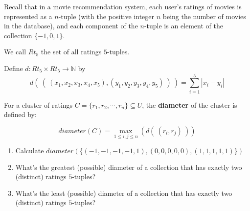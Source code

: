 
Recall that 
in a movie recommendation system, each 
user's ratings of movies is represented as a $n$-tuple 
(with the positive integer $n$ 
being the number of movies in the database), 
and each component of 
the $n$-tuple is an element of the collection $\{-1,0,1\}$. 

We call $Rt_5$ the set of all ratings $5$-tuples.

Define $d: Rt_5 \times Rt_5 \to \mathbb{N}$ by
\[
    d (~(~ (x_1, x_2, x_3, x_4, x_5), (y_1, y_2, y_3, y_4, y_5) ~) ~) = \sum_{i=1}^5 |x_i - y_i|
\]

For a cluster of ratings $C = \{r_1, r_2, \cdots, r_n \} 
\subseteq U$, the {\bf diameter} of the cluster is defined by:

$$\textit{diameter}(C) = \max_{1 \leq i, j \leq n} (d(~(r_i, r_j)~))$$ 

\begin{enumerate}
    \item Calculate $diameter( \{ (-1,-1,-1,-1,1), (0,0,0,0,0), (1,1,1,1,1) \} )$
    \item What's the greatest (possible) diameter of a collection that has exactly two (distinct) ratings $5$-tuples?
    \item What's the least (possible) diameter of a collection that has exactly two (distinct) ratings $5$-tuples?
\end{enumerate}